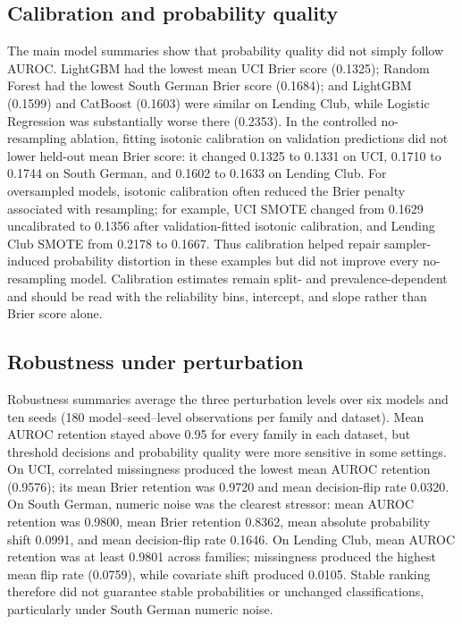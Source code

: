 \documentclass[pdflatex,sn-mathphys-num]{sn-jnl}
\begin{document}
\subsection{Calibration and probability quality}
The main model summaries show that probability quality did not simply follow AUROC. LightGBM had the lowest mean UCI Brier score (0.1325); Random Forest had the lowest South German Brier score (0.1684); and LightGBM (0.1599) and CatBoost (0.1603) were similar on Lending Club, while Logistic Regression was substantially worse there (0.2353). In the controlled no-resampling ablation, fitting isotonic calibration on validation predictions did not lower held-out mean Brier score: it changed 0.1325 to 0.1331 on UCI, 0.1710 to 0.1744 on South German, and 0.1602 to 0.1633 on Lending Club. For oversampled models, isotonic calibration often reduced the Brier penalty associated with resampling; for example, UCI SMOTE changed from 0.1629 uncalibrated to 0.1356 after validation-fitted isotonic calibration, and Lending Club SMOTE from 0.2178 to 0.1667. Thus calibration helped repair sampler-induced probability distortion in these examples but did not improve every no-resampling model. Calibration estimates remain split- and prevalence-dependent and should be read with the reliability bins, intercept, and slope rather than Brier score alone.

\subsection{Robustness under perturbation}
Robustness summaries average the three perturbation levels over six models and ten seeds (180 model--seed--level observations per family and dataset). Mean AUROC retention stayed above 0.95 for every family in each dataset, but threshold decisions and probability quality were more sensitive in some settings. On UCI, correlated missingness produced the lowest mean AUROC retention (0.9576); its mean Brier retention was 0.9720 and mean decision-flip rate 0.0320. On South German, numeric noise was the clearest stressor: mean AUROC retention was 0.9800, mean Brier retention 0.8362, mean absolute probability shift 0.0991, and mean decision-flip rate 0.1646. On Lending Club, mean AUROC retention was at least 0.9801 across families; missingness produced the highest mean flip rate (0.0759), while covariate shift produced 0.0105. Stable ranking therefore did not guarantee stable probabilities or unchanged classifications, particularly under South German numeric noise.
\end{document}
